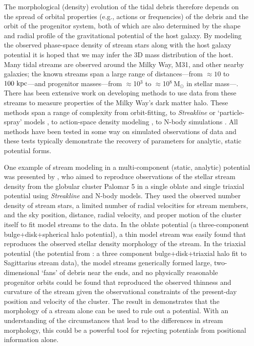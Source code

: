 \documentclass{mn2e}
\newcommand{\msun}{\ensuremath{\mathrm{M}_\odot}}
\begin{document}
The morphological (density) evolution of the tidal debris therefore depends on the spread of orbital properties (e.g., actions or frequencies) of the debris and the orbit of the progenitor system, both of which are also determined by the shape and radial profile of the gravitational potential of the host galaxy. By modeling the observed phase-space density of stream stars along with the host galaxy potential it is hoped that we may infer the 3D mass distribution of the host. Many tidal streams are observed around the Milky Way, M31, and other nearby galaxies; the known streams span a large range of distances---from $\approx10$ to $100~{\rm kpc}$---and progenitor masses---from $\approx$10$^3$ to $\approx$10$^8~\msun$ in stellar mass---\citep[][]{ibata94,odenkirchen01,belokurov06,grillmair06a,grillmair06b,bonaca12}. There has been extensive work on developing methods to use data from these streams to measure properties of the Milky Way's dark matter halo. These methods span a range of complexity from orbit-fitting, to \emph{Streakline} \citep{kuepper12} or `particle-spray' models \citep{gibbons14}, to action-space density modeling \citep[e.g.,][]{sanders14, bovy14}, to N-body simulations \citep[e.g.,][]{law10}. All methods have been tested in some way on simulated observations of data and these tests typically demonstrate the recovery of parameters for analytic, static potential forms.

One example of stream modeling in a multi-component (static, analytic) potential was presented by \citet{pearson15}, who aimed to reproduce observations of the stellar stream density from the globular cluster Palomar 5 in a single oblate and single triaxial potential using \emph{Streakline} \citep{kuepper12} and N-body models. They used the observed number density of stream stars, a limited number of radial velocities for stream members, and the sky position, distance, radial velocity, and proper motion of the cluster itself to fit model streams to the data. In the oblate potential (a three-component bulge+disk+spherical halo potential), a thin model stream was easily found that reproduces the observed stellar density morphology of the stream. In the triaxial potential (the potential from \cite{law10}: a three component bulge+disk+triaxial halo fit to Sagittarius stream data), the model streams generically formed large, two-dimensional `fans' of debris near the ends, and no physically reasonable progenitor orbits could be found that reproduced the observed thinness and curvature of the stream given the observational constraints of the present-day position and velocity of the cluster. The result in \citet{pearson15} demonstrates that the morphology of a stream alone can be used to rule out a potential. With an understanding of the circumstances that lead to the differences in stream morphology, this could be a powerful tool for rejecting potentials from positional information alone.
\end{document}
